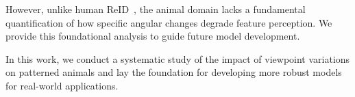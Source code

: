However, unlike human ReID~\cite{sunDissectingPersonReIdentification2019a}, the animal domain lacks a fundamental quantification of how specific angular changes degrade feature perception.
We provide this foundational analysis to guide future model development.

In this work, we conduct a systematic study of the impact of viewpoint variations on patterned animals and lay the foundation for developing more robust models for real-world applications.
